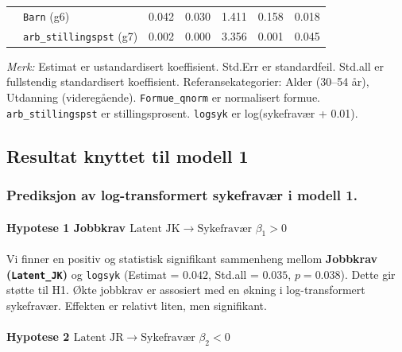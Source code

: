 \documentclass[
  12pt,
  a4paper,
  DIV=11,
  numbers=noendperiod]{scrartcl}
\let\oldparagraph\paragraph
\renewcommand{\paragraph}[1]{\oldparagraph{#1}\mbox{}}
\begin{document}
\begin{table}[htbp]
\begin{tabular}{@{}llrrrrc@{}}
& \texttt{Barn} (g6) & 0.042 & 0.030 & 1.411 & 0.158 & 0.018 \\
& \texttt{arb\_stillingspst} (g7) & 0.002 & 0.000 & 3.356 & 0.001 & 0.045 \\
\bottomrule
\end{tabular}
\footnotesize{\textit{Merk:} Estimat er ustandardisert koeffisient. Std.Err er standardfeil. Std.all er fullstendig standardisert koeffisient. Referansekategorier: Alder (30–54 år), Utdanning (videregående). \texttt{Formue\_qnorm} er normalisert formue. \texttt{arb\_stillingspst} er stillingsprosent. \texttt{logsyk} er log(sykefravær + 0.01).}
\end{table}

\subsection{Resultat knyttet til modell
1}\label{resultat-knyttet-til-modell-1}

\subsubsection{Prediksjon av log-transformert sykefravær i modell
1.}\label{prediksjon-av-log-transformert-sykefravuxe6r-i-modell-1.}

\paragraph{\texorpdfstring{Hypotese 1 Jobbkrav
\(\text{Latent JK} \rightarrow \text{Sykefravær } \beta_1 > 0\)}{Hypotese 1 Jobbkrav \textbackslash text\{Latent JK\} \textbackslash rightarrow \textbackslash text\{Sykefravær \} \textbackslash beta\_1 \textgreater{} 0}}\label{hypotese-1-jobbkrav-textlatent-jk-rightarrow-textsykefravuxe6r-beta_1-0}

Vi finner en positiv og statistisk signifikant sammenheng mellom
\textbf{Jobbkrav (\texttt{Latent\_JK})} og \texttt{logsyk} (Estimat =
\(0.042\), Std.all = \(0.035\), \(p = 0.038\)). Dette gir støtte til H1.
Økte jobbkrav er assosiert med en økning i log-transformert sykefravær.
Effekten er relativt liten, men signifikant.

\paragraph{\texorpdfstring{Hypotese 2
\(\text{Latent JR} \rightarrow \text{Sykefravær } \beta_2 < 0\)}{Hypotese 2 \textbackslash text\{Latent JR\} \textbackslash rightarrow \textbackslash text\{Sykefravær \} \textbackslash beta\_2 \textless{} 0}}\label{hypotese-2-textlatent-jr-rightarrow-textsykefravuxe6r-beta_2-0}
\end{document}
